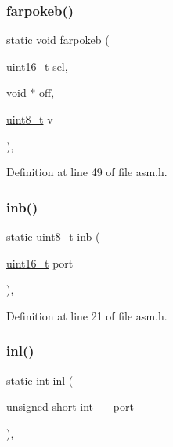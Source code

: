 \subsubsection{\texorpdfstring{farpokeb()}{farpokeb()}}
{\footnotesize\ttfamily static void farpokeb (\begin{DoxyParamCaption}\item[{\hyperlink{a00038_adf4d876453337156dde61095e1f20223_adf4d876453337156dde61095e1f20223}{uint16\+\_\+t}}]{sel,  }\item[{void $\ast$}]{off,  }\item[{\hyperlink{a00038_aba7bc1797add20fe3efdf37ced1182c5_aba7bc1797add20fe3efdf37ced1182c5}{uint8\+\_\+t}}]{v }\end{DoxyParamCaption})\hspace{0.3cm}{\ttfamily [inline]}, {\ttfamily [static]}}



Definition at line 49 of file asm.\+h.

\mbox{\label{a00014_a0223c8898dfec29069879dc51076e28a_a0223c8898dfec29069879dc51076e28a}} 
\subsubsection{\texorpdfstring{inb()}{inb()}}
{\footnotesize\ttfamily static \hyperlink{a00038_aba7bc1797add20fe3efdf37ced1182c5_aba7bc1797add20fe3efdf37ced1182c5}{uint8\+\_\+t} inb (\begin{DoxyParamCaption}\item[{\hyperlink{a00038_adf4d876453337156dde61095e1f20223_adf4d876453337156dde61095e1f20223}{uint16\+\_\+t}}]{port }\end{DoxyParamCaption})\hspace{0.3cm}{\ttfamily [inline]}, {\ttfamily [static]}}



Definition at line 21 of file asm.\+h.

\mbox{\label{a00014_a4a68dda29ab57d4961c91746b06af63f_a4a68dda29ab57d4961c91746b06af63f}} 
\subsubsection{\texorpdfstring{inl()}{inl()}}
{\footnotesize\ttfamily static int inl (\begin{DoxyParamCaption}\item[{unsigned short int}]{\+\_\+\+\_\+port }\end{DoxyParamCaption})\hspace{0.3cm}{\ttfamily [inline]}, {\ttfamily [static]}}



